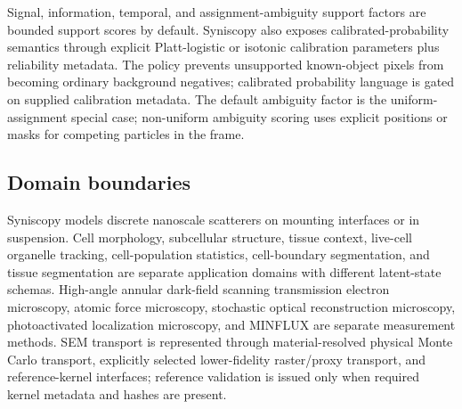 Signal, information, temporal, and assignment-ambiguity support factors are bounded support scores by default. Syniscopy also exposes calibrated-probability semantics through explicit Platt-logistic or isotonic calibration parameters plus reliability metadata. The policy prevents unsupported known-object pixels from becoming ordinary background negatives; calibrated probability language is gated on supplied calibration metadata. The default ambiguity factor is the uniform-assignment special case; non-uniform ambiguity scoring uses explicit positions or masks for competing particles in the frame.

\subsection{Domain boundaries}

Syniscopy models discrete nanoscale scatterers on mounting interfaces or in suspension. Cell morphology, subcellular structure, tissue context, live-cell organelle tracking, cell-population statistics, cell-boundary segmentation, and tissue segmentation are separate application domains with different latent-state schemas. High-angle annular dark-field scanning transmission electron microscopy, atomic force microscopy, stochastic optical reconstruction microscopy, photoactivated localization microscopy, and MINFLUX are separate measurement methods. SEM transport is represented through material-resolved physical Monte Carlo transport, explicitly selected lower-fidelity raster/proxy transport, and reference-kernel interfaces; reference validation is issued only when required kernel metadata and hashes are present.
